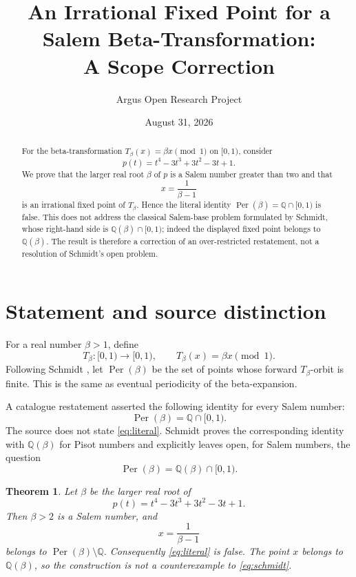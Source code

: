 \documentclass[10pt,reqno]{amsart}
\title[An irrational fixed point in a Salem base]
{An Irrational Fixed Point for a Salem Beta-Transformation:\\
A Scope Correction}
\author{Argus Open Research Project}
\date{August 31, 2026}
\newtheorem{theorem}{Theorem}[section]
\theoremstyle{definition}
\newcommand{\Q}{\mathbb Q}
\newcommand{\Per}{\operatorname{Per}}
\begin{document}
\begin{abstract}
For the beta-transformation \(T_\beta(x)=\beta x\pmod 1\) on \([0,1)\),
consider
\[
 p(t)=t^4-3t^3+3t^2-3t+1.
\]
We prove that the larger real root \(\beta\) of \(p\) is a Salem number
greater than two and that
\[
 x=\frac1{\beta-1}
\]
is an irrational fixed point of \(T_\beta\).  Hence the literal identity
\(\Per(\beta)=\Q\cap[0,1)\) is false.  This does not address the classical
Salem-base problem formulated by Schmidt, whose right-hand side is
\(\Q(\beta)\cap[0,1)\); indeed the displayed fixed point belongs to
\(\Q(\beta)\).  The result is therefore a correction of an over-restricted
restatement, not a resolution of Schmidt's open problem.
\end{abstract}

\maketitle

\section{Statement and source distinction}

For a real number \(\beta>1\), define
\[
 T_\beta\colon[0,1)\longrightarrow[0,1),
 \qquad T_\beta(x)=\beta x\pmod1.
\]
Following Schmidt \cite{Schmidt}, let \(\Per(\beta)\) be the set of points
whose forward \(T_\beta\)-orbit is finite.  This is the same as eventual
periodicity of the beta-expansion.

A catalogue restatement asserted the following identity for every Salem
number:
\begin{equation}\label{eq:literal}
 \Per(\beta)=\Q\cap[0,1).
\end{equation}
The source does not state \eqref{eq:literal}.  Schmidt proves the corresponding
identity with \(\Q(\beta)\) for Pisot numbers and explicitly leaves open, for
Salem numbers, the question
\begin{equation}\label{eq:schmidt}
 \Per(\beta)=\Q(\beta)\cap[0,1).
\end{equation}

\begin{theorem}\label{thm:main}
Let \(\beta\) be the larger real root of
\[
 p(t)=t^4-3t^3+3t^2-3t+1.
\]
Then \(\beta>2\) is a Salem number, and
\[
 x=\frac1{\beta-1}
\]
belongs to \(\Per(\beta)\setminus\Q\).  Consequently
\eqref{eq:literal} is false.  The point \(x\) belongs to \(\Q(\beta)\), so
the construction is not a counterexample to \eqref{eq:schmidt}.
\end{theorem}
\end{document}
